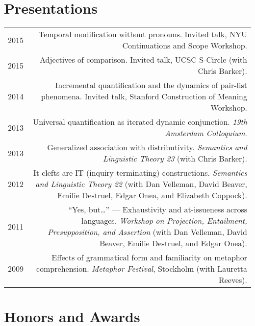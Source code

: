 \documentclass[11pt]{article}
\begin{document}
\section*{Presentations}

\begin{longtable}{LR}
  2015 & Temporal modification without pronouns. Invited talk, NYU
         Continuations and Scope Workshop.\\
  2015 &  Adjectives of comparison. Invited talk, UCSC S-Circle (with Chris
          Barker).\\
  2014 &  Incremental quantification and the dynamics of pair-list phenomena.
          Invited talk, Stanford Construction of Meaning Workshop.\\
  2013 &  Universal quantification as iterated dynamic conjunction. \textit{19th
          Amsterdam Colloquium}.\\
  2013 &  Generalized association with distributivity. \textit{Semantics and
          Linguistic Theory 23} (with Chris Barker).\\
  2012 &  It-clefts are IT (inquiry-terminating) constructions.
          \textit{Semantics and Linguistic Theory 22} (with Dan Velleman,
          David Beaver, Emilie Destruel, Edgar Onea, and Elizabeth Coppock).\\
  2011 &  ``Yes, but\dots'' --- Exhaustivity and at-issueness across languages.
          \textit{Workshop on Projection, Entailment, Presupposition, and
          Assertion} (with Dan Velleman, David Beaver, Emilie Destruel, and
          Edgar Onea).\\
  2009 &  Effects of grammatical form and familiarity on metaphor
          comprehension. \textit{Metaphor Festival}, Stockholm (with Lauretta Reeves).
\end{longtable}


\section*{Honors and Awards}
\end{document}
